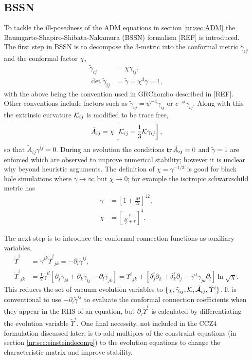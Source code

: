 \subsection{BSSN}
To tackle the ill-posedness of the ADM equations in section \ref{nr:sec:ADM} the Baumgarte-Shapiro-Shibata-Nakamura (BSSN) formalism [REF] is introduced. The first step in BSSN is to decompose the 3-metric into the conformal metric $\tilde{\gamma}_{ij}$ and the conformal factor $\chi$,
\begin{align} 
\tilde{\gamma}_{ij} &= \chi \gamma_{ij},\\
 \det{\tilde{\gamma}_{ij}} &= \tilde{\gamma} = \chi^3\gamma = 1,
\end{align}
with the above being the convention used in GRChombo described in [REF]. Other conventions include factors such as
$\tilde{\gamma}_{ij} = \psi^{-4}\gamma_{ij}$ or $e^{-\phi}\gamma_{ij}$.
 Along with this the extrinsic curvature $\mathcal{K}_{ij}$ is modified to be trace free,
\begin{equation} \tilde{A}_{ij} = \chi\left[ \mathcal{K}_{ij}-\frac{1}{3}\mathcal{K}\gamma_{ij}\right], \end{equation} so that $\tilde{A}_{ij}\gamma^{ij}=0$.
During an evolution the conditions $\trace{\tilde{A}_{ij}=0}$  and $\tilde{\gamma}=1$ are enforced which are observed to improve numerical stability; however it is unclear why beyond heuristic arguments. The definition of $\chi = \gamma^{-1/3}$ is good for black hole simulations where $\gamma\rightarrow\infty$ but $\chi \rightarrow 0$; for example the isotropic schwarzschild metric has 
\begin{align}
\gamma &= \left[ 1+ \frac{M}{2r}\right]^{12},\\
\chi &=\left[ \frac{r}{\frac{M}{2} + r}\right]^4.
\end{align} 

The next step is to introduce the conformal connection functions as auxiliary variables, 
\begin{align} \tilde{\Upsilon}^i &= \tilde{\gamma}^{jk}\tilde{\Upsilon}^i_{\,\;jk} = -\partial_i \tilde{\gamma}^{ij},\\
 \tilde{\Upsilon}^i_{\,\;jk} &= \frac{1}{2}\tilde{\gamma}^{il}\left[ \partial_j \tilde{\gamma}_{kl} + \partial_k \tilde{\gamma}_{lj} - \partial_l \tilde{\gamma}_{jk}\right] = \Upsilon^i_{\;\,jk} + \left[ \delta^i_j \partial_k + \delta^i_k \partial_j - \gamma^{il}\gamma_{jk}\partial_l\right] \ln \sqrt{\chi}.\end{align}
This reduces the set of vacuum evolution variables to $\{\chi,\tilde{\gamma}_{ij},\mathcal{K},\tilde{\mathcal{A}}_{ij},\tilde{\Upsilon}^i \}$. It is conventional to use $-\partial_i \tilde{\gamma}^{ij}$ to evaluate the conformal connection coefficients when they appear in the RHS of an equation, but $\partial_j \tilde{\Upsilon}^i$ is calculated by differentiating the evolution variable $\tilde{\Upsilon}^i$. One final necessity, not included in the CCZ4 formulation discussed later, is to add multiples of the constraint equations (in section \ref{nr:sec:einsteindecomp}) to the evolution equations to change the characteristic matrix and improve stability. 

